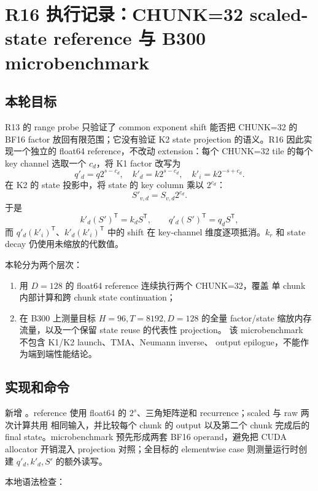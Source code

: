 \section{R16 执行记录：CHUNK=32 scaled-state reference 与 B300 microbenchmark}

\subsection{本轮目标}

R13 的 range probe 只验证了 common exponent shift 能否把 CHUNK=32 的
BF16 factor 放回有限范围；它没有验证 K2 state projection 的语义。R16
因此实现一个独立的 float64 reference，不改动 \FlashKDA{} extension：每个
CHUNK=32 tile 的每个 key channel 选取一个 \(c_d\)，将 K1 factor 改写为
\[
 q'_d=q2^{s-c_d},\quad k'_d=k2^{s-c_d},\quad
 k'_i=k2^{-s+c_d}.
\]
在 K2 的 state 投影中，将 state 的 key column 乘以 \(2^{c_d}\)：
\[
 S'_{v,d}=S_{v,d}2^{c_d}.
\]
于是
\[
 k'_d(S')^\mathsf{T}=k_dS^\mathsf{T},\qquad
 q'_d(S')^\mathsf{T}=q_dS^\mathsf{T},
\]
而 \(q'_d(k'_i)^\mathsf{T}\)、\(k'_d(k'_i)^\mathsf{T}\) 中的 shift
在 key-channel 维度逐项抵消。\(k_r\) 和 state decay 仍使用未缩放的代数值。

本轮分为两个层次：

\begin{enumerate}
  \item 用 \(D=128\) 的 float64 reference 连续执行两个 CHUNK=32，覆盖
        单 chunk 内部计算和跨 chunk state continuation；
  \item 在 B300 上测量目标 \(H=96,T=8192,D=128\) 的全量 factor/state
        缩放内存流量，以及一个保留 state reuse 的代表性 projection。
        该 microbenchmark 不包含 K1/K2 launch、TMA、Neumann inverse、
        output epilogue，不能作为端到端性能结论。
\end{enumerate}

\subsection{实现和命令}

新增 。reference 使用
float64 的 \(2^s\)、三角矩阵逆和 recurrence；scaled 与 raw 两次计算共用
相同输入，并比较每个 chunk 的 output 以及第二个 chunk 完成后的 final
state。microbenchmark 预先形成两套 BF16 operand，避免把 CUDA allocator
开销混入 projection 对照；全目标的 elementwise case 则测量运行时创建
\(q'_d,k'_d,S'\) 的额外读写。

本地语法检查：

